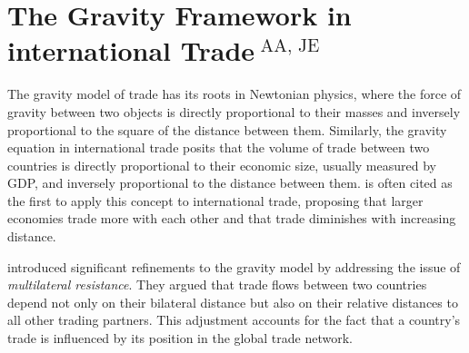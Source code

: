 \section[The Gravity Framework in international Trade]{The Gravity Framework in international Trade$^{\text{ AA, JE}}$}
\label{sec:Gravity_Framework}

The gravity model of trade has its roots in Newtonian physics, where the force of gravity between two objects is directly proportional to their masses and inversely proportional to the square of the distance between them. Similarly, the gravity equation in international trade posits that the volume of trade between two countries is directly proportional to their economic size, usually measured by GDP, and inversely proportional to the distance between them. \textcite{tinbergen1962shaping} is often cited as the first to apply this concept to international trade, proposing that larger economies trade more with each other and that trade diminishes with increasing distance.

\textcite{Anderson2003} introduced significant refinements to the gravity model by addressing the issue of \textit{multilateral resistance}. They argued that trade flows between two countries depend not only on their bilateral distance but also on their relative distances to all other trading partners. This adjustment accounts for the fact that a country’s trade is influenced by its position in the global trade network.

